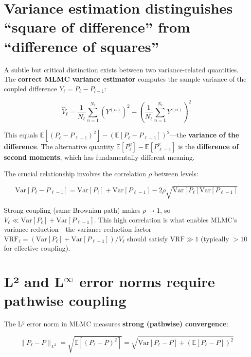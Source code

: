 \documentclass[11pt,a4paper]{article}
\begin{document}
\section{Variance estimation distinguishes ``square of difference'' from ``difference of squares''}

A subtle but critical distinction exists between two variance-related quantities. The \textbf{correct MLMC variance estimator} computes the sample variance of the coupled difference $Y_\ell = P_\ell - P_{l-1}$:

\begin{equation}
\hat{V}_\ell = \frac{1}{N_\ell}\sum_{n=1}^{N_\ell}(Y^{(n)})^2 - \left(\frac{1}{N_\ell}\sum_{n=1}^{N_\ell}Y^{(n)}\right)^2
\end{equation}

\noindent This equals $\mathbb{E}[(P_\ell - P_{\ell-1})^2] - (\mathbb{E}[P_\ell - P_{\ell-1}])^2$---the \textbf{variance of the difference}. The alternative quantity $\mathbb{E}[P_\ell^2] - \mathbb{E}[P_{\ell-1}^2]$ is the \textbf{difference of second moments}, which has fundamentally different meaning.

\vspace{0.2cm}

\noindent The crucial relationship involves the correlation $\rho$ between levels:

\begin{equation}
\text{Var}[P_\ell - P_{\ell-1}] = \text{Var}[P_\ell] + \text{Var}[P_{\ell-1}] - 2\rho\sqrt{\text{Var}[P_\ell]\text{Var}[P_{\ell-1}]}
\end{equation}

\noindent Strong coupling (same Brownian path) makes $\rho \to 1$, so $V_\ell \ll \text{Var}[P_\ell] + \text{Var}[P_{\ell-1}]$. This high correlation is what enables MLMC's variance reduction---the variance reduction factor $\text{VRF}_\ell = (\text{Var}[P_\ell] + \text{Var}[P_{\ell-1}])/V_\ell$ should satisfy $\text{VRF} \gg 1$ (typically \textbf{$>10$} for effective coupling).

\section{L² and L$^\infty$ error norms require pathwise coupling}

The L² error norm in MLMC measures \textbf{strong (pathwise) convergence}:

\begin{equation}
\|P_\ell - P\|_{L^2} = \sqrt{\mathbb{E}[(P_\ell - P)^2]} = \sqrt{\text{Var}[P_\ell - P] + (\mathbb{E}[P_\ell - P])^2}
\end{equation}
\end{document}
